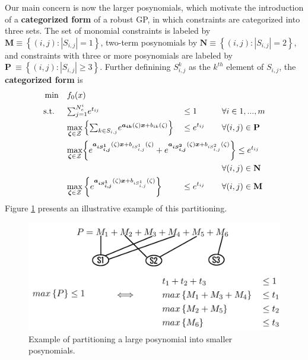 Our main concern is now the larger posynomials, which motivate the introduction of a \textbf{categorized form} of a robust GP, in which constraints are categorized into three sets. The set of monomial constraints is labeled by $\mathbf{M} \equiv \left\{(i, j): |S_{i,j}| = 1\right\}$, two-term posynomials by $\mathbf{N} \equiv \left\{(i, j): |S_{i,j}| = 2\right\}$, and constraints with three or more posynomials are labeled by $\mathbf{P} \ \equiv \left\{(i,j): |S_{i,j}| \geq 3\right\}$. Further definining $S_{i,j}^k$ as the $k^{th}$ element of $S_{i,j}$, the \textbf{categorized form} is
\begin{equation}
\begin{aligned}
&\min &\multicolumn{2}{l}{$f_0(x)$}\\
&\text{s.t.} &\multicolumn{2}{l}{$\textstyle{\sum}_{j=1}^{N_e^i} e^{t_{ij}}$} &&\leq 1 \qquad &&\forall i \in 1,...,m\\
& &\max_{\vec{\zeta} \in \mathcal{Z}}& \left\{\textstyle{\sum}_{k \in S_{i,j}} e^{\vec{a_{ik}}\left(\zeta\right)\vec{x} + b_{ik}\left(\zeta\right)} \right\} &&\leq e^{t_{ij}} &&\forall(i,j) \in \mathbf{P}\\
& &\max_{\vec{\zeta} \in \mathcal{Z}}&
\multicolumn{5}{l}{$\left\{e^{\vec{a_{iS_{i,j}^1}}\left(\zeta\right)\vec{x} + b_{iS_{i,j}^1}\left(\zeta\right)} + e^{\vec{a_{iS_{i,j}^2}}\left(\zeta\right)\vec{x} + b_{iS_{i,j}^2}\left(\zeta\right)} \right\} \leq e^{t_{ij}}$}\\
&&&&& &&\forall(i,j) \in \mathbf{N}\\
& &\max_{\vec{\zeta} \in \mathcal{Z}}& \left\{e^{\vec{a_{iS_{i,j}^1}}\left(\zeta\right)\vec{x} + b_{iS_{i,j}^1}\left(\zeta\right)} \right\} &&\leq e^{t_{ij}} &&\forall(i,j) \in \mathbf{M}\\
\end{aligned}
\label{categorizedForm}
\end{equation}
Figure \ref{partitioning} presents an illustrative example of this partitioning. 
\begin{figure}[H]
\captionsetup{justification=centering, font=small}
\begin{center}
\includegraphics[scale=0.25]{partitioning.png}
\end{center}
\caption{Example of partitioning a large posynomial into smaller posynomials.}
\label{partitioning}
\end{figure}

